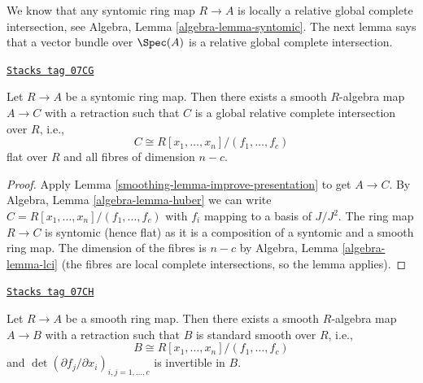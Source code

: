 We know that any syntomic ring map $R \to A$ is locally a relative global
complete intersection, see
Algebra, Lemma \ref{algebra-lemma-syntomic}.
The next lemma says that a vector bundle over $\Spec(A)$ is
a relative global complete intersection.

\begin{lemma}
\label{smoothing-lemma-syntomic-complete-intersection}
\href{https://stacks.math.columbia.edu/tag/07CG}{\texttt{Stacks tag 07CG}}

Let $R \to A$ be a syntomic ring map. Then there exists a smooth $R$-algebra
map $A \to C$ with a retraction such that $C$ is a global relative complete
intersection over $R$, i.e.,
$$
C \cong R[x_1, \ldots, x_n]/(f_1, \ldots, f_c)
$$
flat over $R$ and all fibres of dimension $n - c$.
\end{lemma}

\begin{proof}

Apply Lemma \ref{smoothing-lemma-improve-presentation} to get $A \to C$.
By Algebra, Lemma \ref{algebra-lemma-huber}
we can write $C = R[x_1, \ldots, x_n]/(f_1, \ldots, f_c)$
with $f_i$ mapping to a basis of $J/J^2$.
The ring map $R \to C$ is syntomic (hence flat)
as it is a composition of a syntomic and a smooth ring map.
The dimension of the fibres is $n - c$ by
Algebra, Lemma \ref{algebra-lemma-lci}
(the fibres are local complete intersections, so the lemma applies).
\end{proof}

\begin{lemma}
\label{smoothing-lemma-smooth-standard-smooth}
\href{https://stacks.math.columbia.edu/tag/07CH}{\texttt{Stacks tag 07CH}}

Let $R \to A$ be a smooth ring map. Then there exists a smooth $R$-algebra
map $A \to B$ with a retraction such that $B$ is standard smooth over
$R$, i.e.,
$$
B \cong R[x_1, \ldots, x_n]/(f_1, \ldots, f_c)
$$
and $\det(\partial f_j/\partial x_i)_{i, j = 1, \ldots, c}$
is invertible in $B$.
\end{lemma}

